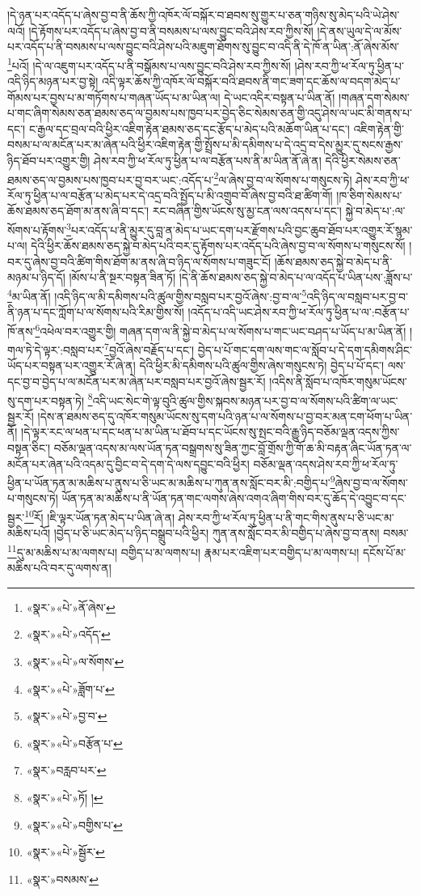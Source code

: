 །དེ་ཉན་པར་འདོད་པ་ཞེས་བྱ་བ་ནི་ཆོས་ཀྱི་འཁོར་ལོ་བསྐོར་བ་ཐབས་སུ་གྱུར་པ་ཅན་གཉིས་སུ་མེད་པའི་ཡེ་ཤེས་ལའོ། །དེ་རྟོགས་པར་འདོད་པ་ཞེས་བྱ་བ་ནི་བསམས་པ་ལས་བྱུང་བའི་ཤེས་རབ་ཀྱིས་སོ། །དེ་ནས་ཡུལ་དེ་ལ་མོས་པར་འདོད་པ་ནི་བསམས་པ་ལས་བྱུང་བའི་ཤེས་པའི་མཇུག་ཐོགས་སུ་བྱུང་བ་འདི་ནི་དེ་ཁོ་ན་ཡིན་:ནོ་ཞེས་མོས་\footnote{«སྣར་»«པེ་»ནོ་ཞེས་}པའོ། །དེ་ལ་འཇུག་པར་འདོད་པ་ནི་བསྒོམས་པ་ལས་བྱུང་བའི་ཤེས་རབ་ཀྱིས་སོ། །ཤེས་རབ་ཀྱི་ཕ་རོལ་ཏུ་ཕྱིན་པ་འདི་ཉིད་མཉན་པར་བྱ་སྟེ། འདི་ལྟར་ཆོས་ཀྱི་འཁོར་ལོ་བསྐོར་བའི་ཐབས་ནི་གང་ཟག་དང་ཆོས་ལ་བདག་མེད་པ་གོམས་པར་བྱས་པ་མ་གཏོགས་པ་གཞན་ཡོད་པ་མ་ཡིན་ལ། དེ་ཡང་འདིར་བསྟན་པ་ཡིན་ནོ། །གཞན་དག་སེམས་པ་གང་ཞིག་སེམས་ཅན་ཐམས་ཅད་ལ་བྱམས་པས་ཁྱབ་པར་བྱེད་ཅིང་སེམས་ཅན་གྱི་འདུ་ཤེས་ལ་ཡང་མི་གནས་པ་དང་། ང་རྒྱལ་དང་བྲལ་བའི་ཕྱིར་འཇིག་རྟེན་ཐམས་ཅད་དང་རྩོད་པ་མེད་པའི་མཆོག་ཡིན་པ་དང་། འཇིག་རྟེན་གྱི་བསམ་པ་ལ་མངོན་པར་མ་ཞེན་པའི་ཕྱིར་འཇིག་རྟེན་གྱི་སྤྲོས་པ་མི་དམིགས་པ་དེ་འདྲ་བ་དེས་མྱུར་དུ་སངས་རྒྱས་ཉིད་ཐོབ་པར་འགྱུར་གྱི། ཤེས་རབ་ཀྱི་ཕ་རོལ་ཏུ་ཕྱིན་པ་ལ་བརྩོན་པས་ནི་མ་ཡིན་ནོ་ཞེ་ན། དེའི་ཕྱིར་སེམས་ཅན་ཐམས་ཅད་ལ་བྱམས་པས་ཁྱབ་པར་བྱ་བར་ཡང་:འདོད་པ་\footnote{«སྣར་»«པེ་»འདོད་}ལ་ཞེས་བྱ་བ་ལ་སོགས་པ་གསུངས་ཏེ། ཤེས་རབ་ཀྱི་ཕ་རོལ་ཏུ་ཕྱིན་པ་ལ་བརྩོན་པ་མེད་པར་དེ་འདྲ་བའི་སྤྱོད་པ་མི་འགྲུབ་བོ་ཞེས་བྱ་བའི་ཐ་ཚིག་གོ། །ཁ་ཅིག་སེམས་པ་ཆོས་ཐམས་ཅད་ཐོག་མ་ནས་ཞི་བ་དང་། རང་བཞིན་གྱིས་ཡོངས་སུ་མྱ་ངན་ལས་འདས་པ་དང་། སྐྱེ་བ་མེད་པ་:ལ་སོགས་པ་རྟོགས་\footnote{«སྣར་»«པེ་»ལ་སོགས་}པར་འདོད་པ་ནི་མྱུར་དུ་བླ་ན་མེད་པ་ཡང་དག་པར་རྫོགས་པའི་བྱང་ཆུབ་ཐོབ་པར་འགྱུར་རོ་སྙམ་པ་ལ། དེའི་ཕྱིར་ཆོས་ཐམས་ཅད་སྐྱེ་བ་མེད་པའི་བར་དུ་རྟོགས་པར་འདོད་པའི་ཞེས་བྱ་བ་ལ་སོགས་པ་གསུངས་སོ། །བར་དུ་ཞེས་བྱ་བའི་ཚིག་གིས་ཐོག་མ་ནས་ཞི་བ་ཉིད་ལ་སོགས་པ་གཟུང་ངོ། །ཆོས་ཐམས་ཅད་སྐྱེ་བ་མེད་པ་ནི་མཉམ་པ་ཉིད་དོ། །མོས་པ་ནི་སྔར་བསྟན་ཟིན་ཏོ། །དེ་ནི་ཆོས་ཐམས་ཅད་སྐྱེ་བ་མེད་པ་ལ་འདོད་པ་ཡིན་པས་:ཟློས་པ་\footnote{«སྣར་»«པེ་»ཟློག་པ་}མ་ཡིན་ནོ། །འདི་ཉིད་ལ་མི་དམིགས་པའི་ཚུལ་གྱིས་བསླབ་པར་བྱའོ་ཞེས་:བྱ་བ་ལ་\footnote{«སྣར་»«པེ་»བྱ་བ་}འདི་ཉིད་ལ་བསླབ་པར་བྱ་བ་ནི་ཉན་པ་དང་ཀློག་པ་ལ་སོགས་པའི་རིམ་གྱིས་སོ། །འདོད་པ་འདི་ཡང་ཤེས་རབ་ཀྱི་ཕ་རོལ་ཏུ་ཕྱིན་པ་ལ་:བརྩོན་པ་ཁོ་ནས་\footnote{«སྣར་»«པེ་»བརྩོན་པ་}འཕེལ་བར་འགྱུར་གྱི། གཞན་དག་ལ་ནི་སྐྱེ་བ་མེད་པ་ལ་སོགས་པ་གང་ཡང་བཤད་པ་ཡོད་པ་མ་ཡིན་ནོ། །གལ་ཏེ་དེ་ལྟར་:བསླབ་པར་\footnote{«སྣར་»བརླབ་པར་}བྱའོ་ཞེས་བརྗོད་པ་དང་། བྱེད་པ་པོ་གང་དག་ལས་གང་ལ་སློབ་པ་དེ་དག་དམིགས་ཤིང་ཡོད་པར་བསྟན་པར་འགྱུར་རོ་ཞེ་ན། དེའི་ཕྱིར་མི་དམིགས་པའི་ཚུལ་གྱིས་ཞེས་གསུངས་ཏེ། བྱེད་པ་པོ་དང་། ལས་དང་བྱ་བ་བྱེད་པ་ལ་མངོན་པར་མ་ཞེན་པར་བསླབ་པར་བྱའོ་ཞེས་སྦྱར་རོ། །འདིས་ནི་སློབ་པ་འཁོར་གསུམ་ཡོངས་སུ་དག་པར་བསྟན་ཏེ། \footnote{«སྣར་»«པེ་»ཏོ། ། }འདི་ཡང་སེང་གེ་ལྟ་བུའི་ཚུལ་གྱིས་སྐབས་མཉན་པར་བྱ་བ་ལ་སོགས་པའི་ཚིག་ལ་ཡང་སྦྱར་རོ། །དེས་ན་ཐམས་ཅད་དུ་འཁོར་གསུམ་ཡོངས་སུ་དག་པའི་ཉན་པ་ལ་སོགས་པ་བྱ་བར་མན་ངག་ཕོག་པ་ཡིན་ནོ། །དེ་ལྟར་རང་ལ་ཕན་པ་དང་ཕན་པ་མ་ཡིན་པ་ཐོབ་པ་དང་ཡོངས་སུ་སྤང་བའི་རྒྱུ་ཉིད་བཅོམ་ལྡན་འདས་ཀྱིས་བསྟན་ཅིང་། བཅོམ་ལྡན་འདས་མ་ལས་ཡོན་ཏན་བསྒྲགས་སུ་ཟིན་ཀྱང་བློ་གྲོས་ཀྱི་གོ་ཆ་མི་བརྟན་ཞིང་ཡོན་ཏན་ལ་མངོན་པར་ཞེན་པའི་འདམ་དུ་བྱིང་བ་དེ་དག་དེ་ལས་དབྱུང་བའི་ཕྱིར། བཅོམ་ལྡན་འདས་ཤེས་རབ་ཀྱི་ཕ་རོལ་ཏུ་ཕྱིན་པ་ཡོན་ཏན་མ་མཆིས་པ་ནུས་པ་ཅི་ཡང་མ་མཆིས་པ་ཀུན་ནས་སློང་བར་མི་:བགྱིད་པ་\footnote{«སྣར་»«པེ་»བགྱིས་པ་}ཞེས་བྱ་བ་ལ་སོགས་པ་གསུངས་ཏེ། ཡོན་ཏན་མ་མཆིས་པ་ནི་ཡོན་ཏན་གང་ལགས་ཞེས་འགའ་ཞིག་གིས་བར་དུ་ཆོད་དེ་འབྱུང་བ་དང་སྦྱར་\footnote{«སྣར་»«པེ་»སྦྱོར་}རོ། །ཇི་ལྟར་ཡོན་ཏན་མེད་པ་ཡིན་ཞེ་ན། ཤེས་རབ་ཀྱི་ཕ་རོལ་ཏུ་ཕྱིན་པ་ནི་གང་གིས་ནུས་པ་ཅི་ཡང་མ་མཆིས་པའོ། །བྱེད་པ་ཅི་ཡང་མེད་པ་ཉིད་བསྒྲུབ་པའི་ཕྱིར། ཀུན་ནས་སློང་བར་མི་བགྱིད་པ་ཞེས་བྱ་བ་ནས། བསམ་\footnote{«སྣར་»བསམས་}དུ་མ་མཆིས་པ་མ་ལགས་པ། བགྱིད་པ་མ་ལགས་པ། རྣམ་པར་འཇིག་པར་བགྱིད་པ་མ་ལགས་པ། དངོས་པོ་མ་མཆིས་པའི་བར་དུ་ལགས་ན། 